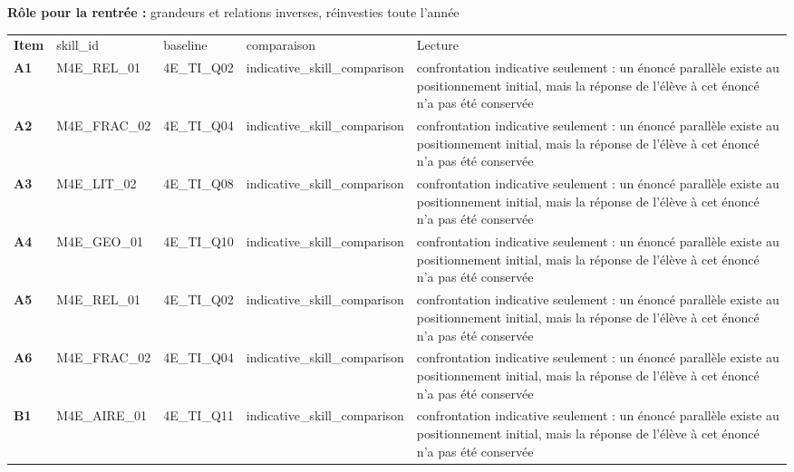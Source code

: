 \documentclass[10pt,a4paper]{article}
\begin{document}
\par\vspace{1mm}\small\textbf{Rôle pour la rentrée :} grandeurs et relations inverses, réinvesties toute l'année
\par\vspace{2mm}
\newpage{}
\par\noindent\begin{tabularx}{\linewidth}{>{\bfseries}p{9mm} >{\ttfamily\scriptsize}p{25mm} >{\ttfamily\scriptsize}p{22mm} >{\ttfamily\scriptsize}p{16mm} X}
\rowcolor{Navy}\color{white}Item & \color{white}\scriptsize skill\_id & \color{white}\scriptsize baseline & \color{white}\scriptsize comparaison & \color{white}Lecture \\
A1 & M4E\_REL\_01 & 4E\_TI\_Q02 & indicative\_skill\_comparison & confrontation indicative seulement : un énoncé parallèle existe au positionnement initial, mais la réponse de l'élève à cet énoncé n'a pas été conservée \\
A2 & M4E\_FRAC\_02 & 4E\_TI\_Q04 & indicative\_skill\_comparison & confrontation indicative seulement : un énoncé parallèle existe au positionnement initial, mais la réponse de l'élève à cet énoncé n'a pas été conservée \\
A3 & M4E\_LIT\_02 & 4E\_TI\_Q08 & indicative\_skill\_comparison & confrontation indicative seulement : un énoncé parallèle existe au positionnement initial, mais la réponse de l'élève à cet énoncé n'a pas été conservée \\
A4 & M4E\_GEO\_01 & 4E\_TI\_Q10 & indicative\_skill\_comparison & confrontation indicative seulement : un énoncé parallèle existe au positionnement initial, mais la réponse de l'élève à cet énoncé n'a pas été conservée \\
A5 & M4E\_REL\_01 & 4E\_TI\_Q02 & indicative\_skill\_comparison & confrontation indicative seulement : un énoncé parallèle existe au positionnement initial, mais la réponse de l'élève à cet énoncé n'a pas été conservée \\
A6 & M4E\_FRAC\_02 & 4E\_TI\_Q04 & indicative\_skill\_comparison & confrontation indicative seulement : un énoncé parallèle existe au positionnement initial, mais la réponse de l'élève à cet énoncé n'a pas été conservée \\
B1 & M4E\_AIRE\_01 & 4E\_TI\_Q11 & indicative\_skill\_comparison & confrontation indicative seulement : un énoncé parallèle existe au positionnement initial, mais la réponse de l'élève à cet énoncé n'a pas été conservée \\

\end{tabularx}
\end{document}
